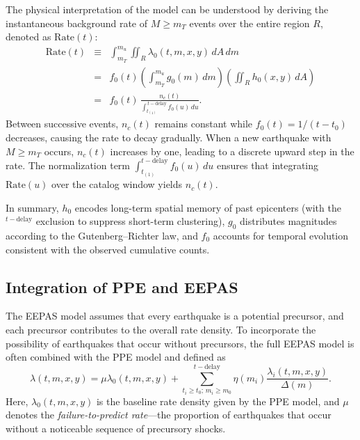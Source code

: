 \documentclass[linenum,doublespace,onecolumn]{SSA-SRL}
\theoremstyle{lemma}
\begin{document}
The physical interpretation of the model can be understood by deriving the instantaneous background rate of $M \ge m_T$ events over the entire region $R$, denoted as $\text{Rate}(t)$:
\begin{eqnarray*}
\text{Rate}(t) & \equiv & \int_{m_T}^{m_u}\!\!\iint_R \lambda_0(t,m,x,y)\,dA\,dm \\
& = & f_0(t)\!\left(\int_{m_T}^{m_u}\! g_0(m)\,dm\right)\!\left(\iint_R h_0(x,y)\,dA\right) \\
& = & f_0(t)\,\frac{n_c(t)}{\displaystyle\int_{t_{(1)}}^{\,t-\text{delay}}\! f_0(u)\,du}.
\end{eqnarray*}
Between successive events, $n_c(t)$ remains constant while $f_0(t) = 1/(t - t_0)$ decreases, causing the rate to decay gradually. When a new earthquake with $M \ge m_T$ occurs, $n_c(t)$ increases by one, leading to a discrete upward step in the rate.  
The normalization term $\int_{t_{(1)}}^{t-\text{delay}} f_0(u)\,du$ ensures that integrating $\text{Rate}(u)$ over the catalog window yields $n_c(t)$.  

In summary, $h_0$ encodes long-term spatial memory of past epicenters (with the ${}^{t-\text{delay}}$ exclusion to suppress short-term clustering), $g_0$ distributes magnitudes according to the Gutenberg--Richter law, and $f_0$ accounts for temporal evolution consistent with the observed cumulative counts.



\subsection{Integration of PPE and EEPAS}

The EEPAS model assumes that every earthquake is a potential precursor, and each precursor contributes to the overall rate density. To incorporate the possibility of earthquakes that occur without precursors, the full EEPAS model is often combined with the PPE model and defined as
\begin{equation}\label{ltmxy}
    \lambda(t,m,x,y) = \mu \lambda_0(t,m,x,y) + \sum_{t_i \geq t_0;\, m_i \geq m_0}^{t - \text{delay}} \eta(m_i) \frac{\lambda_i(t,m,x,y)}{\Delta(m)}.
\end{equation}
Here, $\lambda_0(t,m,x,y)$ is the baseline rate density given by the PPE model, and $\mu$ denotes the \textit{failure-to-predict rate}—the proportion of earthquakes that occur without a noticeable sequence of precursory shocks.
\end{document}
